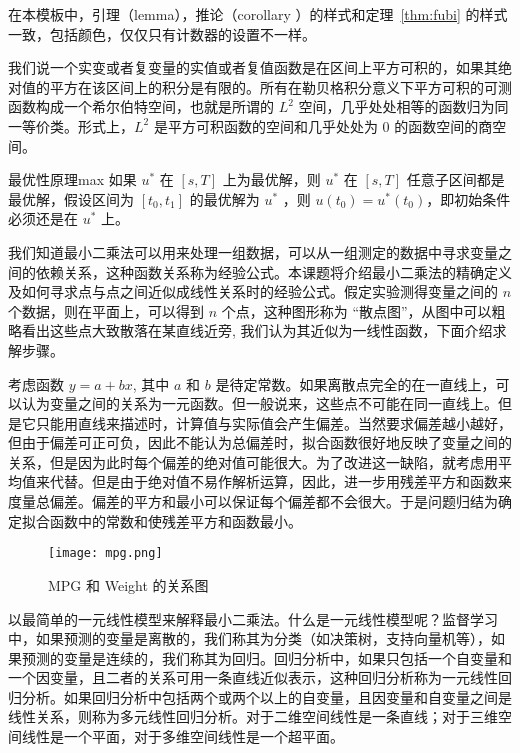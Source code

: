\documentclass{elegantbook}
\begin{document}
\begin{note}
在本模板中，引理（lemma），推论（corollary ）的样式和定理~\ref{thm:fubi} 的样式一致，包括颜色，仅仅只有计数器的设置不一样。
\end{note}

我们说一个实变或者复变量的实值或者复值函数是在区间上平方可积的，如果其绝对值的平方在该区间上的积分是有限的。所有在勒贝格积分意义下平方可积的可测函数构成一个希尔伯特空间，也就是所谓的 $L^2$ 空间，几乎处处相等的函数归为同一等价类。形式上，$L^2$ 是平方可积函数的空间和几乎处处为 0 的函数空间的商空间。

\begin{proposition}{最优性原理}{max}
   如果 $u^*$ 在 $[s,T]$ 上为最优解，则 $u^*$ 在 $[s,T]$ 任意子区间都是最优解，假设区间为 $[t_0,t_1]$ 的最优解为 $u^*$ ，则 $u(t_0)=u^{*}(t_0)$，即初始条件必须还是在 $u^*$ 上。
\end{proposition}

我们知道最小二乘法可以用来处理一组数据，可以从一组测定的数据中寻求变量之间的依赖关系，这种函数关系称为经验公式。本课题将介绍最小二乘法的精确定义及如何寻求点与点之间近似成线性关系时的经验公式。假定实验测得变量之间的 $n$ 个数据，则在平面上，可以得到 $n$ 个点，这种图形称为 “散点图”，从图中可以粗略看出这些点大致散落在某直线近旁, 我们认为其近似为一线性函数，下面介绍求解步骤。


考虑函数 $y=a+bx$, 其中 $a$ 和 $b$ 是待定常数。如果离散点完全的在一直线上，可以认为变量之间的关系为一元函数。但一般说来，这些点不可能在同一直线上。但是它只能用直线来描述时，计算值与实际值会产生偏差。当然要求偏差越小越好，但由于偏差可正可负，因此不能认为总偏差时，拟合函数很好地反映了变量之间的关系，但是因为此时每个偏差的绝对值可能很大。为了改进这一缺陷，就考虑用平均值来代替。但是由于绝对值不易作解析运算，因此，进一步用残差平方和函数来度量总偏差。偏差的平方和最小可以保证每个偏差都不会很大。于是问题归结为确定拟合函数中的常数和使残差平方和函数最小。 

\begin{figure}[!htbp]
	\centering
	\texttt{[image: mpg.png]}
	\caption{MPG 和 Weight 的关系图\label{fig:mpg}}
\end{figure}



以最简单的一元线性模型来解释最小二乘法。什么是一元线性模型呢？监督学习中，如果预测的变量是离散的，我们称其为分类（如决策树，支持向量机等），如果预测的变量是连续的，我们称其为回归。回归分析中，如果只包括一个自变量和一个因变量，且二者的关系可用一条直线近似表示，这种回归分析称为一元线性回归分析。如果回归分析中包括两个或两个以上的自变量，且因变量和自变量之间是线性关系，则称为多元线性回归分析。对于二维空间线性是一条直线；对于三维空间线性是一个平面，对于多维空间线性是一个超平面。
\end{document}
